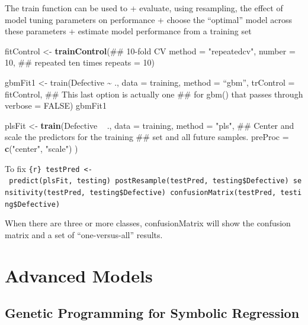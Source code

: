 \documentclass[]{book}
\newenvironment{Shaded}{\begin{snugshade}}{\end{snugshade}}
\newcommand{\KeywordTok}[1]{\textcolor[rgb]{0.13,0.29,0.53}{\textbf{{#1}}}}
\newcommand{\DataTypeTok}[1]{\textcolor[rgb]{0.13,0.29,0.53}{{#1}}}
\newcommand{\DecValTok}[1]{\textcolor[rgb]{0.00,0.00,0.81}{{#1}}}
\newcommand{\StringTok}[1]{\textcolor[rgb]{0.31,0.60,0.02}{{#1}}}
\newcommand{\NormalTok}[1]{{#1}}
\begin{document}
The train function can be used to + evaluate, using resampling, the
effect of model tuning parameters on performance + choose the
``optimal'' model across these parameters + estimate model performance
from a training set

\begin{Shaded}
\begin{Highlighting}[]
\NormalTok{fitControl <-}\StringTok{ }\KeywordTok{trainControl}\NormalTok{(## 10-fold CV}
                           \DataTypeTok{method =} \StringTok{"repeatedcv"}\NormalTok{,}
                           \DataTypeTok{number =} \DecValTok{10}\NormalTok{,}
                           \NormalTok{## repeated ten times}
                           \DataTypeTok{repeats =} \DecValTok{10}\NormalTok{)}
\end{Highlighting}
\end{Shaded}

gbmFit1 \textless{}- train(Defective \textasciitilde{} ., data =
training, method = ``gbm'', trControl = fitControl, \#\# This last
option is actually one \#\# for gbm() that passes through verbose =
FALSE) gbmFit1

\begin{Shaded}
\begin{Highlighting}[]
\NormalTok{plsFit <-}\StringTok{ }\KeywordTok{train}\NormalTok{(Defective ~}\StringTok{ }\NormalTok{.,}
 \DataTypeTok{data =} \NormalTok{training,}
 \DataTypeTok{method =} \StringTok{"pls"}\NormalTok{,}
 \NormalTok{## Center and scale the predictors for the training}
 \NormalTok{## set and all future samples.}
 \DataTypeTok{preProc =} \KeywordTok{c}\NormalTok{(}\StringTok{"center"}\NormalTok{, }\StringTok{"scale"}\NormalTok{)}
\NormalTok{)}
\end{Highlighting}
\end{Shaded}

To fix
\texttt{\{r\}\ testPred\ \textless{}-\ predict(plsFit,\ testing)\ postResample(testPred,\ testing\$Defective)\ sensitivity(testPred,\ testing\$Defective)\ confusionMatrix(testPred,\ testing\$Defective)}

When there are three or more classes, confusionMatrix will show the
confusion matrix and a set of ``one-versus-all'' results.

\chapter{Advanced Models}\label{advanced-models}

\section{Genetic Programming for Symbolic
Regression}\label{genetic-programming-for-symbolic-regression}
\end{document}
